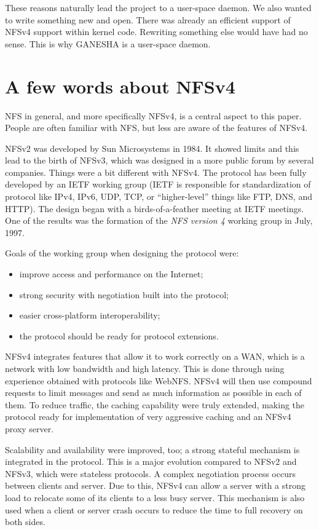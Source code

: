 \documentclass[final]{ols}
\begin{document}
These reasons naturally lead the project to a user-space daemon. We
also wanted to write something new and open. There was already an
efficient support of NFSv4 support within kernel code. Rewriting
something else would have had no sense. This is why GANESHA is a
user-space daemon. 

\section{A few words about NFSv4}

NFS in general, and more specifically NFSv4, is a central aspect to
this paper. People are often familiar with NFS, but less are aware of
the features of NFSv4.

NFSv2 was developed by Sun Microsystems in 1984. It showed limits and
this lead to the birth of NFSv3, which was designed in a more public
forum by several companies. Things were a bit different with NFSv4.
The protocol has been fully developed by an IETF working group (IETF
is responsible for standardization of protocol like IPv4, IPv6, UDP,
TCP, or ``higher-level'' things like FTP, DNS, and HTTP). The design
began with a birds-of-a-feather meeting at IETF meetings. One of the
results was the formation of the \textit{NFS version 4} working group in
July, 1997.

Goals of the working group when designing the protocol were:
\begin{itemize}
\item improve access and performance on the Internet;
\item strong security with negotiation built into the protocol;
\item easier cross-platform interoperability;
\item the protocol should be ready for protocol extensions. 
\end{itemize}

NFSv4 integrates features that allow it to work correctly on a WAN,
which is a network with low bandwidth and high latency. This is done through
using experience obtained with protocols like WebNFS. NFSv4 will
then use compound requests to limit messages and send as much
information as possible in each of them. To reduce traffic, the
caching capability were truly extended, making the protocol ready for
implementation of very aggressive caching and an NFSv4 proxy server.

Scalability and availability were improved, too; a strong stateful
mechanism is integrated in the protocol. This is a major evolution
compared to NFSv2 and NFSv3, which were stateless protocols. A complex
negotiation process occurs between clients and server. Due to this,
NFSv4 can allow a server with a strong load to relocate some of its
clients to a less busy server. This mechanism is also used when
a client or server crash occurs to reduce the time to full recovery on
both sides.
\end{document}
